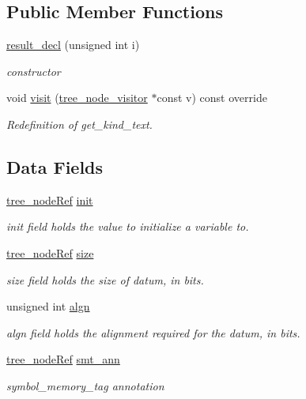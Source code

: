 \subsection*{Public Member Functions}
\begin{DoxyCompactItemize}
\item 
\hyperlink{structresult__decl_a269b33ed51fc71e03640ffdda7d90b0e}{result\+\_\+decl} (unsigned int i)
\begin{DoxyCompactList}\small\item\em constructor \end{DoxyCompactList}\item 
void \hyperlink{structresult__decl_a139725df13e7c33ae94f604d42aa708e}{visit} (\hyperlink{classtree__node__visitor}{tree\+\_\+node\+\_\+visitor} $\ast$const v) const override
\begin{DoxyCompactList}\small\item\em Redefinition of get\+\_\+kind\+\_\+text. \end{DoxyCompactList}\end{DoxyCompactItemize}
\subsection*{Data Fields}
\begin{DoxyCompactItemize}
\item 
\hyperlink{tree__node_8hpp_a6ee377554d1c4871ad66a337eaa67fd5}{tree\+\_\+node\+Ref} \hyperlink{structresult__decl_a9b98bd73700d1ad257eadc43c07f82a8}{init}
\begin{DoxyCompactList}\small\item\em init field holds the value to initialize a variable to. \end{DoxyCompactList}\item 
\hyperlink{tree__node_8hpp_a6ee377554d1c4871ad66a337eaa67fd5}{tree\+\_\+node\+Ref} \hyperlink{structresult__decl_ae8bd48e2d4826ea104a025c3b072132e}{size}
\begin{DoxyCompactList}\small\item\em size field holds the size of datum, in bits. \end{DoxyCompactList}\item 
unsigned int \hyperlink{structresult__decl_a9112408cf30b8c711b2fcde3add3c7ff}{algn}
\begin{DoxyCompactList}\small\item\em algn field holds the alignment required for the datum, in bits. \end{DoxyCompactList}\item 
\hyperlink{tree__node_8hpp_a6ee377554d1c4871ad66a337eaa67fd5}{tree\+\_\+node\+Ref} \hyperlink{structresult__decl_a5d43f8fb419b7fd6dde366912e535bf0}{smt\+\_\+ann}
\begin{DoxyCompactList}\small\item\em symbol\+\_\+memory\+\_\+tag annotation \end{DoxyCompactList}\end{DoxyCompactItemize}
